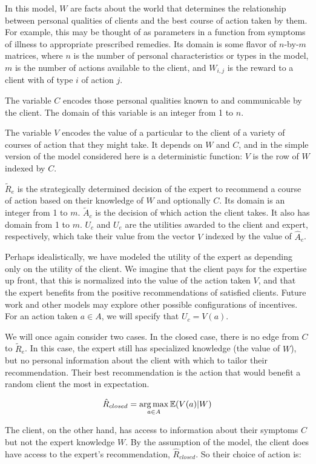 \documentclass[../thesis.tex]{subfiles}
\begin{document}
In this model, $W$ are facts about the world that
determines the relationship between personal qualities
of clients and the best course of action taken by them.
For example, this may be thought of as parameters in
a function from symptoms of illness to appropriate prescribed
remedies.
Its domain is some flavor of $n$-by-$m$ matrices, where
$n$ is the number of personal characteristics or types in the model,
$m$ is the number of actions available to the client,
and $W_{i,j}$ is the reward to a client with of type $i$
of action $j$.

The variable $C$ encodes those personal qualities known to
and communicable by the client.
The domain of this variable is an integer from 1 to $n$.

The variable $V$ encodes the value of a particular to the client
of a variety of courses of action that they might take.
It depends on $W$ and $C$, and in the simple version of the
model considered here is a deterministic function: $V$
is the row of $W$ indexed by $C$.

$\tilde{R}_e$ is the strategically determined decision of
the expert to recommend a course of action based on their
knowledge of $W$ and optionally $C$. Its domain is an
integer from 1 to $m$.
$\tilde{A}_c$ is the decision of which action the client takes.
It also has domain from 1 to $m$.
$U_c$ and $U_e$ are the utilities awarded to the client and expert,
respectively, which take their value from the vector $V$ indexed
by the value of $\hat{A}_c$.

Perhaps idealistically, we have modeled the utility
of the expert as depending only on the utility of the
client.
We imagine that the client pays for the expertise
up front, that this is normalized into the value
of the action taken $V$, and that the expert
benefits from the positive recommendations of
satisfied clients.
Future work and other models may explore other
possible configurations of incentives.
For an action taken $a \in A$, we will
specify that $U_c = V(a)$.

We will once again consider two cases.
In the closed case, there is no edge from
$C$ to $\tilde{R}_e$.
In this case, the expert still has specialized knowledge
(the value of $W$), but no personal information about the
client with which to tailor their recommendation.
Their best recommendation is the action that would
benefit a random client the most in expectation.

$$\hat{R}_{closed} = \operatorname*{arg\,max}_{a \in A} \mathbb{E}(V(a) \vert W)$$

The client, on the other hand, has access to information
about their symptoms $C$ but not the expert knowledge $W$.
By the assumption of the model, the client does have access
to the expert's recommendation, $\hat{R}_{closed}$.
So their choice of action is:
\end{document}

